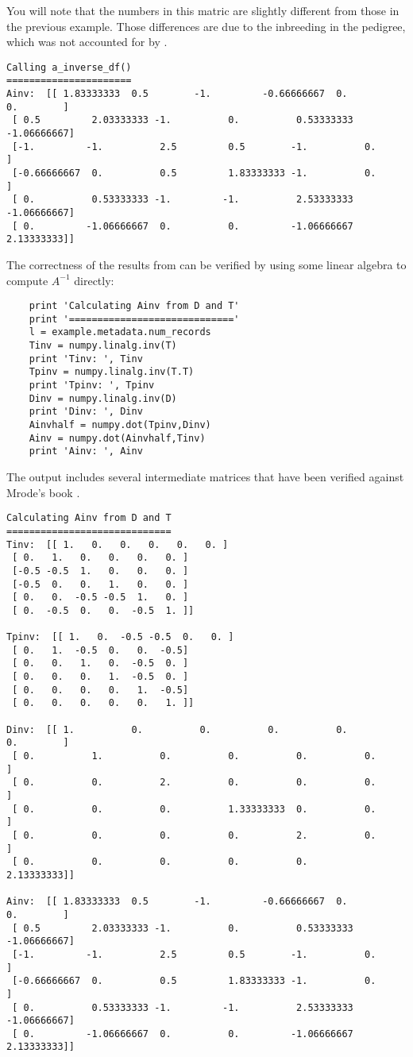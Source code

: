 You will note that the numbers in this matric are slightly different from those in the previous example. Those differences are due to the inbreeding in the pedigree, which was not accounted for by .
\begin{verbatim}
Calling a_inverse_df()
======================
Ainv:  [[ 1.83333333  0.5        -1.         -0.66666667  0.          0.        ]
 [ 0.5         2.03333333 -1.          0.          0.53333333 -1.06666667]
 [-1.         -1.          2.5         0.5        -1.          0.        ]
 [-0.66666667  0.          0.5         1.83333333 -1.          0.        ]
 [ 0.          0.53333333 -1.         -1.          2.53333333 -1.06666667]
 [ 0.         -1.06666667  0.          0.         -1.06666667  2.13333333]]
\end{verbatim}
The correctness of the results from \function{} can be verified by using some linear algebra to compute $A^{-1}$ directly:
\begin{verbatim}
    print 'Calculating Ainv from D and T'
    print '============================='
    l = example.metadata.num_records
    Tinv = numpy.linalg.inv(T)
    print 'Tinv: ', Tinv
    Tpinv = numpy.linalg.inv(T.T)
    print 'Tpinv: ', Tpinv
    Dinv = numpy.linalg.inv(D)
    print 'Dinv: ', Dinv
    Ainvhalf = numpy.dot(Tpinv,Dinv)
    Ainv = numpy.dot(Ainvhalf,Tinv)
    print 'Ainv: ', Ainv
\end{verbatim}
The output includes several intermediate matrices that have been verified against Mrode's book \cite{ref224}.
\begin{verbatim}
Calculating Ainv from D and T
=============================
Tinv:  [[ 1.   0.   0.   0.   0.   0. ]
 [ 0.   1.   0.   0.   0.   0. ]
 [-0.5 -0.5  1.   0.   0.   0. ]
 [-0.5  0.   0.   1.   0.   0. ]
 [ 0.   0.  -0.5 -0.5  1.   0. ]
 [ 0.  -0.5  0.   0.  -0.5  1. ]]

Tpinv:  [[ 1.   0.  -0.5 -0.5  0.   0. ]
 [ 0.   1.  -0.5  0.   0.  -0.5]
 [ 0.   0.   1.   0.  -0.5  0. ]
 [ 0.   0.   0.   1.  -0.5  0. ]
 [ 0.   0.   0.   0.   1.  -0.5]
 [ 0.   0.   0.   0.   0.   1. ]]

Dinv:  [[ 1.          0.          0.          0.          0.          0.        ]
 [ 0.          1.          0.          0.          0.          0.        ]
 [ 0.          0.          2.          0.          0.          0.        ]
 [ 0.          0.          0.          1.33333333  0.          0.        ]
 [ 0.          0.          0.          0.          2.          0.        ]
 [ 0.          0.          0.          0.          0.          2.13333333]]

Ainv:  [[ 1.83333333  0.5        -1.         -0.66666667  0.          0.        ]
 [ 0.5         2.03333333 -1.          0.          0.53333333 -1.06666667]
 [-1.         -1.          2.5         0.5        -1.          0.        ]
 [-0.66666667  0.          0.5         1.83333333 -1.          0.        ]
 [ 0.          0.53333333 -1.         -1.          2.53333333 -1.06666667]
 [ 0.         -1.06666667  0.          0.         -1.06666667  2.13333333]]
\end{verbatim}
